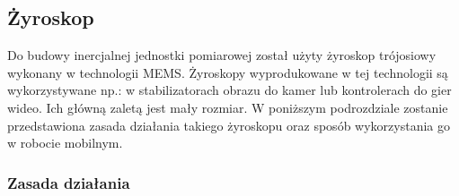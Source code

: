 \subsection{Żyroskop}
Do budowy inercjalnej jednostki pomiarowej został użyty żyroskop trójosiowy wykonany w technologii MEMS. Żyroskopy wyprodukowane w tej technologii są wykorzystywane np.: w stabilizatorach obrazu do kamer lub kontrolerach do gier wideo. Ich główną zaletą jest mały rozmiar. W poniższym podrozdziale zostanie  przedstawiona zasada działania takiego żyroskopu oraz sposób wykorzystania go w robocie mobilnym.

\subsubsection{Zasada działania}

